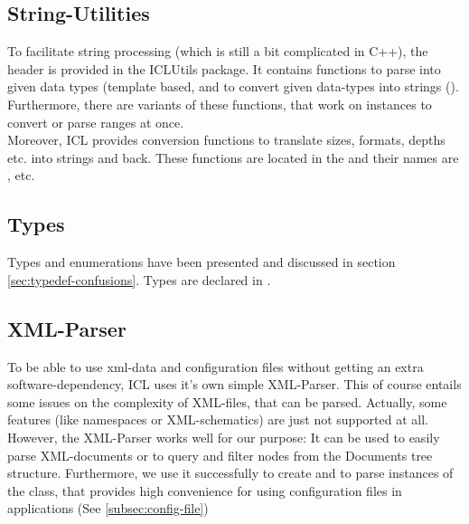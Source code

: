 \subsection{String-Utilities}
To facilitate string processing (which is still a bit complicated in C++), the header  is provided in the ICLUtils package. It contains functions to parse  into given data types (template based,  and to convert given data-types into strings (). Furthermore, there are variants of these functions, that work on  instances to convert or parse ranges at once.\\
Moreover, ICL provides conversion functions to translate sizes, formats, depths etc. into strings and back. These functions are located in the  and their names are ,  etc.

\subsection{Types}
Types and enumerations have been presented and discussed in section \ref{sec:typedef-confusions}. Types are declared in .

\subsection{XML-Parser}
To be able to use xml-data and configuration files without getting an extra software-dependency, ICL uses it's own simple XML-Parser. This of course entails some issues on the complexity of XML-files, that can be parsed. Actually, some features (like namespaces or XML-schematics) are just not supported at all.\\
However, the XML-Parser works well for our purpose: It can be used to easily parse XML-documents or to query and filter nodes from the Documents tree structure. Furthermore, we use it successfully to create and to parse instances of the  class, that provides high convenience for using configuration files in applications (See \ref{subsec:config-file})

